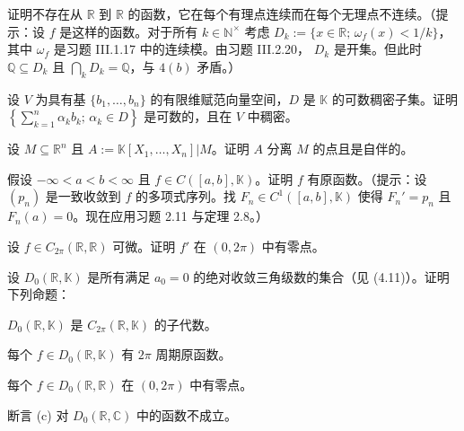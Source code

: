 \begin{exercises}
证明不存在从  $\mathbb{R}$ 到  $\mathbb{R}$ 的函数，它在每个有理点连续而在每个无理点不连续。（提示：设  $f$ 是这样的函数。对于所有  $k \in \mathbb{N}^\times$ 考虑  $D_k := \{ x \in \mathbb{R} ; \, \omega_f(x) < 1/k \}$，其中  $\omega_f$ 是习题 III.1.17 中的连续模。由习题 III.2.20， $D_k$ 是开集。但此时  $\mathbb{Q} \subseteq D_k$ 且  $\bigcap_k D_k = \mathbb{Q}$，与  $4(b)$ 矛盾。）

\item

设 $V$ 为具有基 $\{b_1, \ldots, b_n\}$ 的有限维赋范向量空间，$D$ 是 $\mathbb{K}$ 的可数稠密子集。证明 $\left\{ \sum_{k=1}^{n} \alpha_k b_k ; \, \alpha_k \in D \right\}$ 是可数的，且在 $V$ 中稠密。

\item

设  $M \subseteq \mathbb{R}^n$ 且  $A := \mathbb{K}[X_1, \ldots, X_n] | M$。证明  $A$ 分离  $M$ 的点且是自伴的。

\item

假设  $-\infty < a < b < \infty$ 且  $f \in C([a, b], \mathbb{K})$。证明  $f$ 有原函数。（提示：设  $(p_n)$ 是一致收敛到  $f$ 的多项式序列。找  $F_n \in C^1([a, b], \mathbb{K})$ 使得  $F_n' = p_n$ 且  $F_n(a) = 0$。现在应用习题 2.11 与定理 2.8。）

\item

设  $f \in C_{2\pi}(\mathbb{R}, \mathbb{R})$ 可微。证明  $f'$ 在  $(0, 2\pi)$ 中有零点。

\item

设  $D_0(\mathbb{R}, \mathbb{K})$ 是所有满足  $a_0 = 0$ 的绝对收敛三角级数的集合（见 (4.11)）。证明下列命题：

\begin{items}
\item

$D_0(\mathbb{R}, \mathbb{K})$ 是  $C_{2\pi}(\mathbb{R}, \mathbb{K})$ 的子代数。

\item

每个  $f \in D_0(\mathbb{R}, \mathbb{K})$ 有  $2\pi$ 周期原函数。

\item

每个  $f \in D_0(\mathbb{R}, \mathbb{R})$ 在  $(0, 2\pi)$ 中有零点。

\item

断言 (c) 对  $D_{0}(\mathbb{R}, \mathbb{C})$ 中的函数不成立。


\end{items}
\end{exercises}
